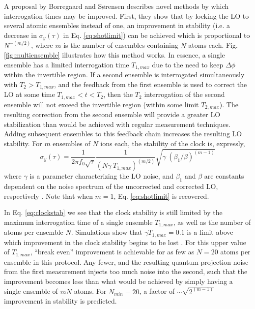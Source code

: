 A proposal by Borregaard and S\o{}rensen \cite{BorregaardSorensen} describes novel methods by which interrogation times may be improved. First, they show that by locking the LO to several atomic ensembles instead of one, an improvement in stability (i.e. a decrease in $\sigma_y(\tau)$ in Eq. \ref{eq:shotlimit}) can be achieved which is proportional to $N^{-(m/2)}$, where $m$ is the number of ensembles containing $N$ atoms each. Fig. \ref{fig:multiensemble} illustrates how this method works. In essence, a single ensemble has a limited interrogation time $T_{1,max}$ due to the need to keep $\Delta \phi$ within the invertible region. If a second ensemble is interrogated simultaneously with $T_2 > T_{1,max}$, and the feedback from the first ensemble is used to correct the LO at some time $T_{1,max} < t < T_2$, then the $T_2$ interrogation of the second ensemble will not exceed the invertible region (within some limit $T_{2,max}$). The resulting correction from the second ensemble will provide a greater LO stabilization than would be achieved with regular measurement techniques. Adding subsequent ensembles to this feedback chain increases the resulting LO stability. For $m$ ensembles of $N$ ions each, the stability of the clock is, expressly,
\begin{equation}
\sigma_y (\tau) = \frac{1}{2 \pi f_0 \sqrt{\tau} } \frac{1}{(N \gamma \ T_{1,max})^{(m/2)}}  \sqrt{\gamma \ (\beta_1 / \beta)^{(m-1)} }
\label{eq:clockstab}
\end{equation}    
where $\gamma$ is a parameter characterizing the LO noise, and $\beta_1$ and $\beta$ are constants dependent on the noise spectrum of the uncorrected and corrected LO, respectively \cite{BorregaardSorensen}. Note that when $m = 1$, Eq. \ref{eq:shotlimit} is recovered.  


In Eq. \ref{eq:clockstab} we see that the clock stability is still limited by the maximum interrogation time of a single ensemble $T_{1,max}$, as well as the number of atoms per ensemble $N$. Simulations show that $\gamma T_{1,max} = 0.1$ is a limit above which improvement in the clock stability begins to be lost \cite{BorregaardSorensen}. For this upper value of $T_{1,max}$, ``break even'' improvement is achievable for as few as $N = 20$ atoms per ensemble in this protocol. Any fewer, and the resulting quantum projection noise from the first measurement injects too much noise into the second, such that the improvement becomes less than what would be achieved by simply having a single ensemble of $m N$ atoms. For $N_{min} = 20$, a factor of $\sim \sqrt{2^{(m-1)} }$ improvement in stability is predicted. 

